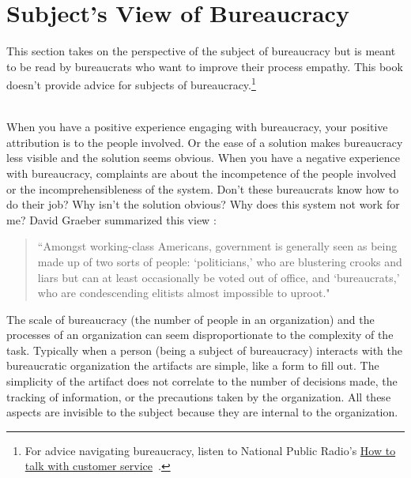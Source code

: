 \section{Subject's View of Bureaucracy\label{sec:subjects-view}}

This section takes on the perspective of the subject of bureaucracy but is meant to be read by bureaucrats who want to improve their \gls{process empathy}. This book doesn't provide advice for subjects of bureaucracy.\footnote{For advice navigating bureaucracy, listen to National Public Radio's \href{https://www.npr.org/2022/03/16/1086915600/get-what-you-want-customer-service}{How to talk with customer service}~\cite{2022_LifeKit}.} 

\ \\

When you have a positive experience engaging with bureaucracy, your positive attribution is to the people involved. Or the ease of a solution makes bureaucracy less visible and the solution seems obvious. 
When you have a negative experience with bureaucracy, complaints are about the incompetence of the people involved or the incomprehensibleness of the system. Don't these bureaucrats know how to do their job? Why isn't the solution obvious? Why does this system not work for me? David Graeber summarized this view \cite{2015_Graeber_regulation}:
\begin{quote}
 ``Amongst working-class Americans, government is generally seen as being made up of two sorts of people: `politicians,' who are blustering crooks and liars but can at least occasionally be voted out of office, and `bureaucrats,' who are condescending elitists almost impossible to uproot."
\end{quote}



The scale of bureaucracy (the number of people in an organization) and the processes of an organization can seem disproportionate to the complexity of the task. Typically when a person (being a subject of bureaucracy) interacts with the bureaucratic organization the artifacts are simple, like a form to fill out. The simplicity of the artifact does not correlate to the number of decisions made, the tracking of information, or the precautions taken by the organization. All these aspects are invisible to the subject because they are internal to the organization.

